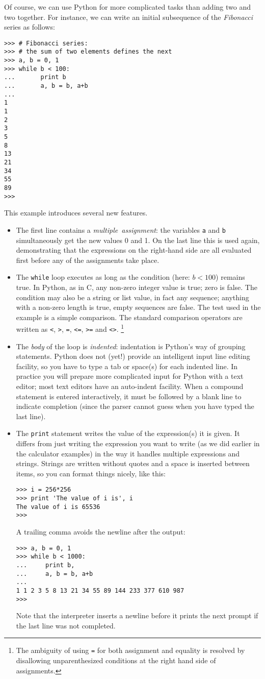 Of course, we can use Python for more complicated tasks than adding two
and two together.
For instance, we can write an initial subsequence of the
{\em Fibonacci}
series as follows:
\bcode\begin{verbatim}
>>> # Fibonacci series:
>>> # the sum of two elements defines the next
>>> a, b = 0, 1
>>> while b < 100:
...       print b
...       a, b = b, a+b
... 
1
1
2
3
5
8
13
21
34
55
89
>>> 
\end{verbatim}\ecode
This example introduces several new features.
\begin{itemize}
\item
The first line contains a
{\em multiple\ assignment}:
the variables
{\tt a}
and
{\tt b}
simultaneously get the new values 0 and 1.
On the last line this is used again, demonstrating that the expressions
on the right-hand side are all evaluated first before any of the
assignments take place.
\item
The
{\tt while}
loop executes as long as the condition (here: $b < 100$) remains true.
In Python, as in C, any non-zero integer value is true; zero is false.
The condition may also be a string or list value, in fact any sequence;
anything with a non-zero length is true, empty sequences are false.
The test used in the example is a simple comparison.
The standard comparison operators are written as
{\tt <},
{\tt >},
{\tt =},
{\tt <=},
{\tt >=}
and
{\tt <>}.%
\footnote{
	The ambiguity of using {\tt =}
	for both assignment and equality is resolved by disallowing
	unparenthesized conditions at the right hand side of assignments.
}
\item
The
{\em body}
of the loop is
{\em indented}: indentation is Python's way of grouping statements.
Python does not (yet!) provide an intelligent input line editing
facility, so you have to type a tab or space(s) for each indented line.
In practice you will prepare more complicated input for Python with a
text editor; most text editors have an auto-indent facility.
When a compound statement is entered interactively, it must be
followed by a blank line to indicate completion (since the parser
cannot guess when you have typed the last line).
\item
The
{\tt print}
statement writes the value of the expression(s) it is given.
It differs from just writing the expression you want to write (as we did
earlier in the calculator examples) in the way it handles multiple
expressions and strings.
Strings are written without quotes and a space is inserted between
items, so you can format things nicely, like this:
\bcode\begin{verbatim}
>>> i = 256*256
>>> print 'The value of i is', i
The value of i is 65536
>>> 
\end{verbatim}\ecode
A trailing comma avoids the newline after the output:
\bcode\begin{verbatim}
>>> a, b = 0, 1
>>> while b < 1000:
...     print b,
...     a, b = b, a+b
... 
1 1 2 3 5 8 13 21 34 55 89 144 233 377 610 987
>>> 
\end{verbatim}\ecode
Note that the interpreter inserts a newline before it prints the next
prompt if the last line was not completed.
\end{itemize}

